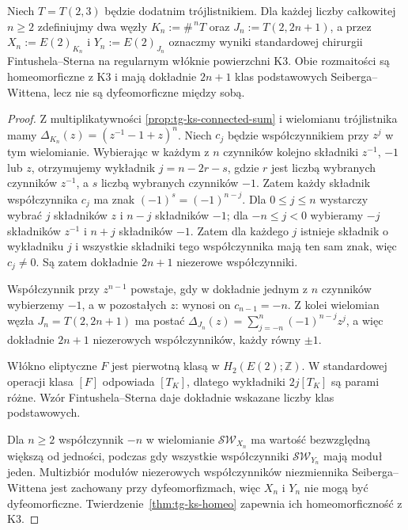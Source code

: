 \begin{twierdzenie}
\label{thm:tg-ks-equal-basic-count}
Niech $T=T(2,3)$ będzie dodatnim trójlistnikiem.
Dla każdej liczby całkowitej $n\ge2$ zdefiniujmy
dwa węzły $K_n:=\#^{\,n}T$ oraz
$J_n:=T(2,2n+1)$, a przez
$X_n:=E(2)_{K_n}$ i
$Y_n:=E(2)_{J_n}$ oznaczmy wyniki
standardowej chirurgii Fintushela--Sterna
na regularnym włóknie powierzchni K3.
Obie rozmaitości są homeomorficzne z K3
i mają dokładnie $2n+1$ klas podstawowych
Seiberga--Wittena, lecz nie są
dyfeomorficzne między sobą.
\end{twierdzenie}

\begin{proof}
Z multiplikatywności
\ref{prop:tg-ks-connected-sum}
i wielomianu trójlistnika mamy
$\Delta_{K_n}(z)=(z^{-1}-1+z)^n$.
Niech $c_j$ będzie współczynnikiem
przy $z^j$ w tym wielomianie.
Wybierając w każdym z $n$
czynników kolejno składniki
$z^{-1}$, $-1$ lub $z$,
otrzymujemy wykładnik
$j=n-2r-s$, gdzie
$r$ jest liczbą wybranych
czynników $z^{-1}$, a $s$
liczbą wybranych czynników $-1$.
Zatem każdy składnik
współczynnika $c_j$
ma znak $(-1)^s=(-1)^{n-j}$.
Dla $0\le j\le n$ wystarczy wybrać $j$ składników
$z$ i $n-j$ składników $-1$; dla $-n\le j<0$
wybieramy $-j$ składników $z^{-1}$ i $n+j$
składników $-1$. Zatem dla każdego $j$
istnieje składnik o wykładniku $j$ i wszystkie
składniki tego współczynnika mają ten sam znak,
więc $c_j\ne0$.
Są zatem dokładnie
$2n+1$ niezerowe współczynniki.

Współczynnik przy $z^{n-1}$
powstaje, gdy w dokładnie jednym
z $n$ czynników wybierzemy
$-1$, a w pozostałych $z$:
wynosi on $c_{n-1}=-n$.
Z kolei wielomian węzła
$J_n=T(2,2n+1)$ ma postać
$\Delta_{J_n}(z)
=\sum_{j=-n}^{n}(-1)^{n-j}z^j$,
a więc dokładnie $2n+1$
niezerowych współczynników,
każdy równy $\pm1$.

Włókno eliptyczne $F$
jest pierwotną klasą
w $H_2(E(2);\mathbb Z)$.
W standardowej operacji
klasa $[F]$ odpowiada
$[T_K]$, dlatego wykładniki
$2j[T_K]$ są parami różne.
Wzór Fintushela--Sterna daje
dokładnie wskazane liczby
klas podstawowych.

Dla $n\ge2$ współczynnik
$-n$ w wielomianie
$\mathcal{SW}_{X_n}$
ma wartość bezwzględną
większą od jedności,
podczas gdy wszystkie
współczynniki
$\mathcal{SW}_{Y_n}$
mają moduł jeden.
Multizbiór modułów
niezerowych współczynników
niezmiennika Seiberga--Wittena
jest zachowany przy
dyfeomorfizmach, więc
$X_n$ i $Y_n$ nie mogą
być dyfeomorficzne.
Twierdzenie~\ref{thm:tg-ks-homeo}
zapewnia ich homeomorficzność
z K3.
\end{proof}

